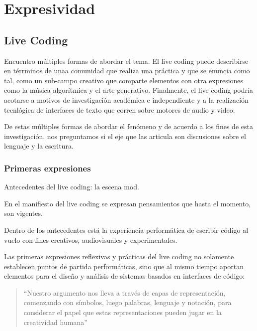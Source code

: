 \chapter{Expresividad}


\section{Live Coding} %


Encuentro múltiples formas de abordar el tema. El live coding puede describirse en térrminos de unaa comunidad que realiza una práctica y que se enuncia como tal, como un sub-campo creativo que comparte elementos con otra expresiones como la música algorítmica y el arte generativo. Finalmente, el live coding podría acotarse a motivos de investigación académica e independiente y a la realización tecnlógica de interfaces de texto que corren sobre motores de audio y video.

De estas múltiples formas de abordar el fenómeno y de acuerdo a los fines de esta investigación, nos preguntamos si el eje que las articula son discusiones sobre el lenguaje y la escritura. 

\subsection{Primeras expresiones}

Antecedentes del live coding: la escena mod.

En el manifiesto del live coding se expresan pensamientos que hasta el momento, son vigentes. 

Dentro de los antecedentes está la experiencia performática de escribir código al vuelo con fines creativos, audiovisuales y experimentales.

Las primeras expresiones reflexivas y prácticas del live coding no solamente establecen puntos de partida performáticas, sino que al mismo tiempo aportan elementos para el diseño y análisis de sistemas basados en interfaces de código:

\begin{quote}

  ``Nuestro argumento nos lleva a través de capas de representación, comenzando con símbolos, luego palabras, lenguaje y notación, para considerar el papel que estas representaciones pueden jugar en la creatividad humana'' \citep[p.~3]{McLean2011}

\end{quote}

